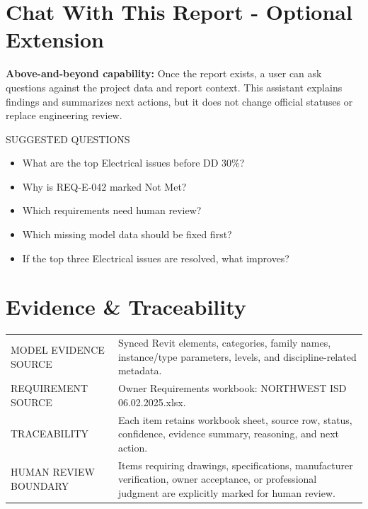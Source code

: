 \documentclass[10pt,letterpaper]{article}
\newcommand{\strong}[1]{\textbf{\textcolor{emaNavy}{#1}}}
\newcommand{\smalllabel}[1]{{\scriptsize\textcolor{emaMuted}{\MakeUppercase{#1}}}}
\begin{document}
\section*{Chat With This Report - Optional Extension}

\begin{tcolorbox}[colback=white,borderline west={3pt}{0pt}{emaBlue}]
\strong{Above-and-beyond capability:} Once the report exists, a user can ask questions against the project data and report context. This assistant explains findings and summarizes next actions, but it does not change official statuses or replace engineering review.
\end{tcolorbox}

\begin{tcolorbox}[colback=emaSoft]
\smalllabel{Suggested Questions}
\begin{itemize}
  \item What are the top Electrical issues before DD 30\%?
  \item Why is REQ-E-042 marked Not Met?
  \item Which requirements need human review?
  \item Which missing model data should be fixed first?
  \item If the top three Electrical issues are resolved, what improves?
\end{itemize}
\end{tcolorbox}

\section*{Evidence \& Traceability}

\begin{tcolorbox}
\begin{tabularx}{\textwidth}{p{1.7in}X}
\smalllabel{Model Evidence Source} & Synced Revit elements, categories, family names, instance/type parameters, levels, and discipline-related metadata. \\
\smalllabel{Requirement Source} & Owner Requirements workbook: NORTHWEST ISD 06.02.2025.xlsx. \\
\smalllabel{Traceability} & Each item retains workbook sheet, source row, status, confidence, evidence summary, reasoning, and next action. \\
\smalllabel{Human Review Boundary} & Items requiring drawings, specifications, manufacturer verification, owner acceptance, or professional judgment are explicitly marked for human review. \\
\end{tabularx}
\end{tcolorbox}
\end{document}
